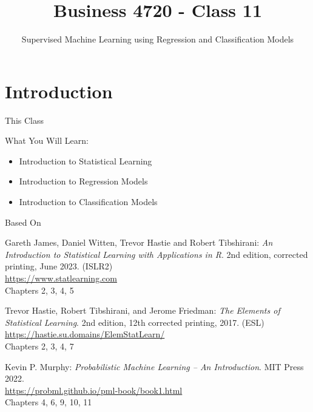 \documentclass[ignorenonframetext,xcolor=x11names]{beamer}
\title{Business 4720 - Class 11}
\subtitle{Supervised Machine Learning using Regression and Classification Models}
\begin{document}
\begin{frame}[label=full]{}
  \titlepage
  \footnotesize
  
\end{frame}

\section{Introduction}

\begin{frame}[label=full]{This Class}

\begin{block}{What You Will Learn:}
\begin{itemize}
  \item Introduction to Statistical Learning
  \item Introduction to Regression Models
  \item Introduction to Classification Models
\end{itemize}
\end{block}
\end{frame}

\begin{frame}[label=full]{Based On}
\small
\begin{block}{}
Gareth James, Daniel Witten, Trevor Hastie and Robert Tibshirani: \emph{An Introduction to Statistical Learning with Applications in R}. 2nd edition, corrected printing, June 2023. (ISLR2) \\
\vspace{1mm}
\url{https://www.statlearning.com} \\
\vspace{1mm}
Chapters 2, 3, 4, 5
\end{block}

\begin{block}{}
Trevor Hastie, Robert Tibshirani, and Jerome Friedman: \emph{The Elements of Statistical Learning}. 2nd edition, 12th corrected printing, 2017. (ESL) \\
\vspace{1mm}
\url{https://hastie.su.domains/ElemStatLearn/} \\
\vspace{1mm}
Chapters 2, 3, 4, 7
\end{block}

\begin{block}{}
Kevin P. Murphy: \emph{Probabilistic Machine Learning -- An Introduction}. MIT Press 2022. \\
\vspace{1mm}
\url{https://probml.github.io/pml-book/book1.html} \\
\vspace{1mm}
Chapters 4, 6, 9, 10, 11
\end{block}
\end{frame}
\end{document}
